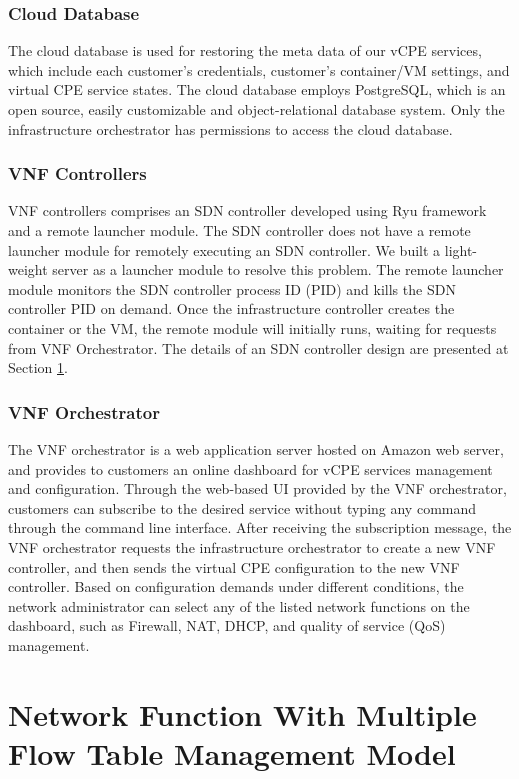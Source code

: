 \documentclass[conference]{IEEEtran}
\begin{document}
\subsubsection{Cloud Database}
The cloud database is used for restoring the meta data of our vCPE services, which include each customer’s credentials, customer’s container/VM settings, and virtual CPE service states. The cloud database employs PostgreSQL, which is an open source, easily customizable and object-relational database system. Only the infrastructure orchestrator has permissions to access the cloud database.

\subsubsection{VNF Controllers}
VNF controllers comprises an SDN controller developed using Ryu framework \cite{web:ryu} and a remote launcher module. The SDN controller does not have a remote launcher module for remotely executing an SDN controller. We built a light-weight server as a launcher module to resolve this problem. The remote launcher module monitors the SDN controller process ID (PID) and kills the SDN controller PID on demand. Once the infrastructure controller  creates the container or the VM, the remote module will initially runs, waiting for requests from VNF Orchestrator. The details of an SDN controller design are presented at Section \ref{sec:mft}.

\subsubsection{VNF Orchestrator}
The VNF orchestrator is a web application server hosted on Amazon web server, and provides to customers an online dashboard for vCPE services management and configuration. Through the web-based UI provided by the VNF orchestrator, customers can subscribe to the desired service without typing any command through the command line interface. After receiving the subscription message, the VNF orchestrator requests the infrastructure orchestrator to create a new VNF controller, and then sends the virtual CPE configuration to the new VNF controller. Based on configuration demands under different conditions, the network administrator can select any of the listed network functions on the dashboard, such as Firewall, NAT, DHCP, and quality of service (QoS) management.


\section{Network Function With Multiple Flow Table Management Model} \label{sec:mft}
\end{document}
